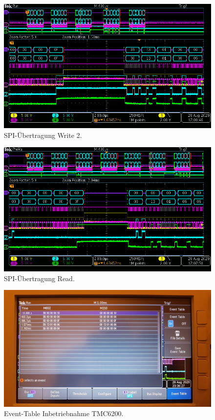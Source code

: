 \begin{appendix}
\newpage

\begin{figure}[h!]
\center
\includegraphics[width = \textwidth]{graphics/TMC6200_Beschreiben}
\caption{SPI-Übertragung Write 2.}
\label{fig:TMC6200_Beschreiben}
\end{figure}

\begin{figure}[h!]
\center
\includegraphics[width = \textwidth]{graphics/TMC6200_Lesen}
\caption{SPI-Übertragung Read.}
\label{fig:TMC6200_Lesen}
\end{figure}

\newpage

\begin{figure}[h!]
\center
\includegraphics[width = \textwidth]{graphics/TMC6200_EventTable_Beschreiben_Bild}
\caption{Event-Table Inbetriebnahme TMC6200.}
\label{fig:TMC6200_EventTable_Beschreiben_Bild}
\end{figure}


\end{appendix}
